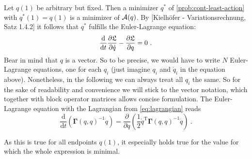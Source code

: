 Let $q(1)$ be arbitrary but fixed.
Then a minimizer $q^\ast$ of \cref{prob:cont-least-action} with $q^\ast(1) = q(1)$ is a minimizer of $\mathcal{A}(q)$.
By [Kielhöfer - Variationsrechnung, Satz 1.4.2] it follows that $q^\ast$ fulfills the Euler-Lagrange equation:
\begin{equation}
	\frac{\mathrm{d}}{\mathrm{d}t} \frac{\partial \fL}{\partial \dot{q}} - \frac{\partial \fL}{\partial q} = 0 \ .
\end{equation}
Bear in mind that $q$ is a vector.
So to be precise, we would have to write $N$ Euler-Lagrange equations, one for each $q_i$ (just imagine $q_i$ and $\dot{q}_i$ in the equation above).
Nonetheless, in the following we can always treat all $q_i$ the same.
So for the sake of readability and convenience we will stick to the vector notation, which together with block operator matrices allows concise formulation.
The Euler-Lagrange equation with the Lagrangian from \cref{eq:lagrangian} reads
\begin{equation}
\label{eq:concrete-lagrangian}
	\frac{\mathrm{d}}{\mathrm{d}t} \left(\mathbf{\Gamma}(q, q)^{-1} \dot{q} \right)
	= \frac{\partial}{\partial q} \left(\frac{1}{2} \dot{q}^\mathrm{T} \mathbf{\Gamma}(q, q)^{-1} \dot{q}\right) \ .
\end{equation}

As this is true for all endpoints $q(1)$, it especially holds true for the value for which the whole expression is minimal.
